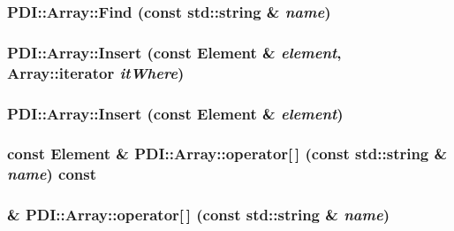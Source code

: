 \hypertarget{class_p_d_i_1_1_array_fac74ad3ceaa61f117762932643f4fce}{
\subsubsection[{Find}]{ PDI::Array::Find (const std::string \& {\em name})}}
\label{class_p_d_i_1_1_array_fac74ad3ceaa61f117762932643f4fce}


\hypertarget{class_p_d_i_1_1_array_1a57377b77b961453690f23d804a2b60}{
\subsubsection[{Insert}]{ PDI::Array::Insert (const {\bf Element} \& {\em element}, \/  {\bf Array::iterator} {\em itWhere})}}
\label{class_p_d_i_1_1_array_1a57377b77b961453690f23d804a2b60}


\hypertarget{class_p_d_i_1_1_array_2b6d1df5bfbd6fcc9d9e07e7b9ec9b7a}{
\subsubsection[{Insert}]{ PDI::Array::Insert (const {\bf Element} \& {\em element})}}
\label{class_p_d_i_1_1_array_2b6d1df5bfbd6fcc9d9e07e7b9ec9b7a}


\hypertarget{class_p_d_i_1_1_array_6195970cb8f192b39dc764456abfa8f0}{
\subsubsection[{operator[]}]{\setlength{\rightskip}{0pt plus 5cm}const {\bf Element} \& PDI::Array::operator\mbox{[}$\,$\mbox{]} (const std::string \& {\em name}) const}}
\label{class_p_d_i_1_1_array_6195970cb8f192b39dc764456abfa8f0}


\hypertarget{class_p_d_i_1_1_array_1d3f248c3f8ec6e42e9633bafad51797}{
\subsubsection[{operator[]}]{ \& PDI::Array::operator\mbox{[}$\,$\mbox{]} (const std::string \& {\em name})}}
\label{class_p_d_i_1_1_array_1d3f248c3f8ec6e42e9633bafad51797}


